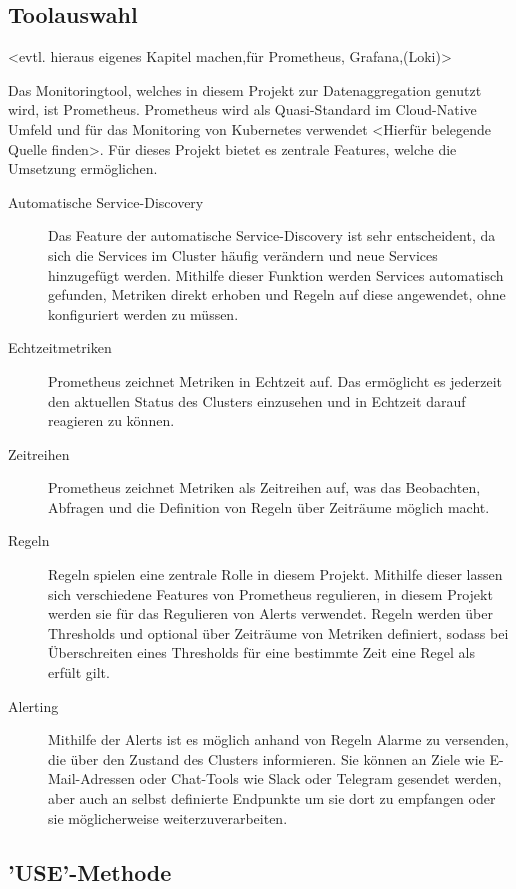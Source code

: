 \documentclass[a4paper,12pt]{scrartcl}
\begin{document}
\subsection{Toolauswahl} <evtl. hieraus eigenes Kapitel machen,für Prometheus, Grafana,(Loki)>

Das Monitoringtool, welches in diesem Projekt zur Datenaggregation genutzt wird, ist Prometheus. Prometheus wird als Quasi-Standard im Cloud-Native Umfeld und für das Monitoring von Kubernetes verwendet <Hierfür belegende Quelle finden>. Für dieses Projekt bietet es zentrale Features, welche die Umsetzung ermöglichen.

\begin{description}

\item[Automatische Service-Discovery]
Das Feature der automatische Service-Discovery ist sehr entscheident, da sich die Services im Cluster häufig verändern und neue Services hinzugefügt werden. Mithilfe dieser Funktion werden Services automatisch gefunden, Metriken direkt erhoben und Regeln auf diese angewendet, ohne konfiguriert werden zu müssen.
\item[Echtzeitmetriken]
Prometheus zeichnet Metriken in Echtzeit auf. Das ermöglicht es jederzeit den aktuellen Status des Clusters einzusehen und in Echtzeit darauf reagieren zu können.
\item[Zeitreihen]
Prometheus zeichnet Metriken als Zeitreihen auf, was das Beobachten, Abfragen und die Definition von Regeln über Zeiträume möglich macht. 
\item[Regeln]
Regeln spielen eine zentrale Rolle in diesem Projekt. Mithilfe dieser lassen sich verschiedene Features von Prometheus regulieren, in diesem Projekt werden sie für das Regulieren von Alerts verwendet.
Regeln werden über Thresholds und optional über Zeiträume von Metriken definiert, sodass bei Überschreiten eines Thresholds für eine bestimmte Zeit eine Regel als erfült gilt.
\item[Alerting]
Mithilfe der Alerts ist es möglich anhand von Regeln Alarme zu versenden, die über den Zustand des Clusters informieren. Sie können an Ziele wie E-Mail-Adressen oder Chat-Tools wie Slack oder Telegram gesendet werden, aber auch  an selbst definierte Endpunkte um sie dort zu empfangen oder sie möglicherweise weiterzuverarbeiten.

\end{description}

\subsection{'USE'-Methode}
\end{document}
